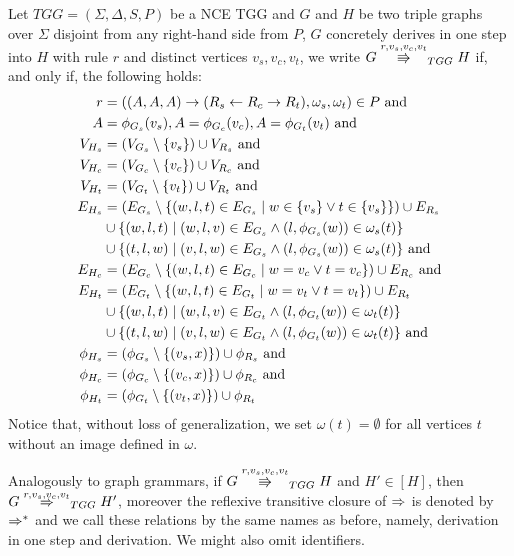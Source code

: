 \documentclass[]{report}
\begin{document}
\begin{definition}
	\label{def:tgg_dstep}
	Let $TGG = (\Sigma, \Delta, S, P)$ be a NCE TGG and $G$ and $H$ be two triple graphs over $\Sigma$ disjoint from any right-hand side from $P$, $G$ concretely derives in one step into $H$ with rule $r$ and distinct vertices $v_s, v_c, v_t$, we write $G \tcderiv{r}{v_s,v_c,v_t}{TGG} H$ if, and only if, the following holds:
	\begin{align*}
	r & = ((A,A,A) \to (R_s \overset{}{\leftarrow} R_c \overset{}{\rightarrow} R_t), \omega_s, \omega_t) \in P \text{ and } \\
	A & = \phi_{G_s}(v_s) , A = \phi_{G_c}(v_c) , A = \phi_{G_t}(v_t) \text{ and}\\
	V_{H_s}  & = (V_{G_s} \setminus \{v_s\}) \cup V_{R_s} \text{ and}\\
	V_{H_c}  & = (V_{G_c} \setminus \{v_c\}) \cup V_{R_c} \text{ and}\\
	V_{H_t}  & = (V_{G_t} \setminus \{v_t\}) \cup V_{R_t} \text{ and}\\
	E_{H_s} & = (E_{G_s} \setminus \{(w,l,t) \in E_{G_s} \; | \; w \in \{v_s\} \lor t \in \{v_s\} \}) \cup E_{R_s} \\
	& \cup \{(w,l,t) \; | \; (w,l,v) \in E_{G_s} \land (l,\phi_{G_s}(w)) \in \omega_{s}(t)\} \\
	& \cup \{(t,l,w) \; | \; (v,l,w) \in E_{G_s} \land (l,\phi_{G_s}(w)) \in \omega_{s}(t)\} \text{ and} \\
	E_{H_c} & = (E_{G_c} \setminus \{(w,l,t) \in E_{G_c} \; | \; w = v_c \lor t = v_c \}) \cup E_{R_c} \text{ and} \\
	E_{H_t} & = (E_{G_t} \setminus \{(w,l,t) \in E_{G_t} \; | \; w = v_t \lor t = v_t \}) \cup E_{R_t} \\
	& \cup \{(w,l,t) \; | \; (w,l,v) \in E_{G_t} \land (l,\phi_{G_t}(w)) \in \omega_{t}(t)\} \\
	& \cup \{(t,l,w) \; | \; (v,l,w) \in E_{G_t} \land (l,\phi_{G_t}(w)) \in \omega_{t}(t)\} \text{ and} \\
	\phi_{H_s} & = (\phi_{G_s} \setminus \{(v_s,x)\}) \cup \phi_{R_s} \text{ and}\\
	\phi_{H_c} & = (\phi_{G_c} \setminus \{(v_c,x)\}) \cup \phi_{R_c} \text{ and}\\
	\phi_{H_t} & = (\phi_{G_t} \setminus \{(v_t,x)\}) \cup \phi_{R_t}\\
	\end{align*}
	Notice that, without loss of generalization, we set $\omega(t) = \emptyset$ for all vertices $t$ without an image defined in $\omega$.
	
	Analogously to graph grammars, if $G \cderiv{r}{v_s,v_c,v_t}{TGG} H$ and $H' \in [H]$, then $G \tderiv{r}{v_s,v_c,v_t}{TGG} H'$, moreover the reflexive transitive closure of $\tderiv{}{}{}$ is denoted by $\tderivtr{}{}{}$ and we call these relations by the same names as before, namely, derivation in one step and derivation. We might also omit identifiers.
\end{definition}
\end{document}
